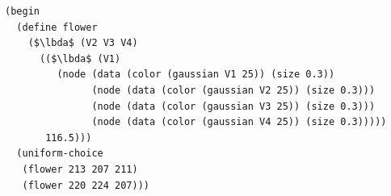 \documentclass[a4paper,10pt]{article}
\newcommand{\lbda}{\color[rgb]{0,.3,.7} \lambda}
\begin{document}
\begin{lstlisting}[mathescape=true]
(begin
  (define flower
    ($\lbda$ (V2 V3 V4)
      (($\lbda$ (V1)
         (node (data (color (gaussian V1 25)) (size 0.3))
               (node (data (color (gaussian V2 25)) (size 0.3)))
               (node (data (color (gaussian V3 25)) (size 0.3)))
               (node (data (color (gaussian V4 25)) (size 0.3)))))
       116.5)))
  (uniform-choice
   (flower 213 207 211)
   (flower 220 224 207)))
\end{lstlisting}

\begin{figure}
\end{figure}
\end{document}
